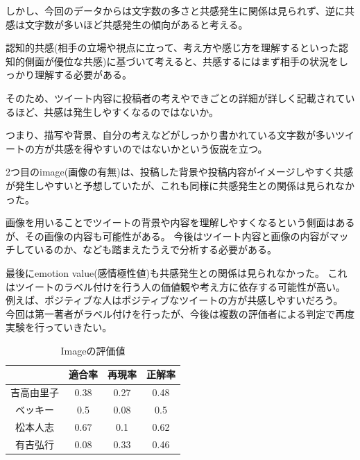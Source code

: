 \documentclass[dvipdfmx]{issj}
\begin{document}
しかし、今回のデータからは文字数の多さと共感発生に関係は見られず、逆に共感は文字数が多いほど共感発生の傾向があると考える。

認知的共感(相手の立場や視点に立って、考え方や感じ方を理解するといった認知的側面が優位な共感)に基づいて考えると、共感するにはまず相手の状況をしっかり理解する必要がある。

そのため、ツイート内容に投稿者の考えやできごとの詳細が詳しく記載されているほど、共感は発生しやすくなるのではないか。

つまり、描写や背景、自分の考えなどがしっかり書かれている文字数が多いツイートの方が共感を得やすいのではないかという仮説を立つ。


2つ目のimage(画像の有無)は、投稿した背景や投稿内容がイメージしやすく共感が発生しやすいと予想していたが、これも同様に共感発生との関係は見られなかった。

画像を用いることでツイートの背景や内容を理解しやすくなるという側面はあるが、その画像の内容も可能性がある。
今後はツイート内容と画像の内容がマッチしているのか、なども踏まえたうえで分析する必要がある。


最後にemotion value(感情極性値)も共感発生との関係は見られなかった。
これはツイートのラベル付けを行う人の価値観や考え方に依存する可能性が高い。
例えば、ポジティブな人はポジティブなツイートの方が共感しやすいだろう。
今回は第一著者がラベル付けを行ったが、今後は複数の評価者による判定で再度実験を行っていきたい。

\begin{table}[t]
  \begin{center}
    \caption{Imageの評価値}
    \begin{tabular}{c|ccc} \hline \hline
& 適合率 & 再現率 & 正解率 \\ \hline \hline
吉高由里子 &0.38&0.27&0.48 \\ \hline
ベッキー &0.5&0.08&0.5\\ \hline
松本人志 &0.67&0.1&0.62 \\ \hline
有吉弘行 & 0.08&0.33&0.46 \\ \hline
    \end{tabular}
    \label{tab:tripcode_user}
  \end{center}
\end{table}
\end{document}
